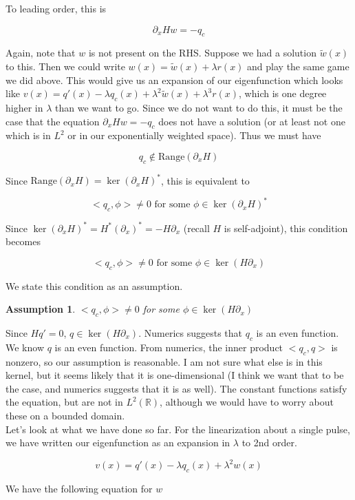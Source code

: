 \documentclass[12pt]{article}
\def\R{{\mathbb R}}
\newtheorem{assumption}{Assumption}
\begin{document}
To leading order, this is

\[
\partial_x H w = -q_c
\]

Again, note that $w$ is not present on the RHS. Suppose we had a solution $\tilde{w}(x)$ to this. Then we could write $w(x) = \tilde{w}(x) + \lambda r(x)$ and play the same game we did above. This would give us an expansion of our eigenfunction which looks like $v(x) = q'(x) - \lambda q_c(x) + \lambda^2 \tilde{w}(x) + \lambda^3 r(x)$, which is one degree higher in $\lambda$ than we want to go. Since we do not want to do this, it must be the case that the equation $\partial_x H w = -q_c$ does not have a solution (or at least not one which is in $L^2$ or in our exponentially weighted space). Thus we must have

\[
q_c \notin \textrm{Range}(\partial_x H)
\]

Since $\textrm{Range}(\partial_x H) = \ker (\partial_x H)^*$, this is equivalent to 

\[
<q_c, \phi> \neq 0 \text{ for some }\phi \in \ker(\partial_x H)^*
\]

Since $\ker(\partial_x H)^* = H^* (\partial_x)^* = -H \partial_x$ (recall $H$ is self-adjoint), this condition becomes

\[
<q_c, \phi> \neq 0 \text{ for some }\phi \in \ker(H \partial_x)
\]

We state this condition as an assumption.

\begin{assumption}
$<q_c, \phi> \neq 0$ for some $\phi \in \ker(H \partial_x)$
\end{assumption}

Since $H q' = 0$, $q \in \ker(H \partial_x)$. Numerics suggests that $q_c$ is an even function. We know $q$ is an even function. From numerics, the inner product $<q_c, q>$ is nonzero, so our assumption is reasonable. I am not sure what else is in this kernel, but it seems likely that it is one-dimensional (I think we want that to be the case, and numerics suggests that it is as well). The constant functions satisfy the equation, but are not in $L^2(\R)$, although we would have to worry about these on a bounded domain.\\

Let's look at what we have done so far. For the linearization about a single pulse, we have written our eigenfunction as an expansion in $\lambda$ to 2nd order.

\[
v(x) = q'(x) - \lambda q_c(x) + \lambda^2 w(x)
\]

We have the following equation for $w$
\end{document}
